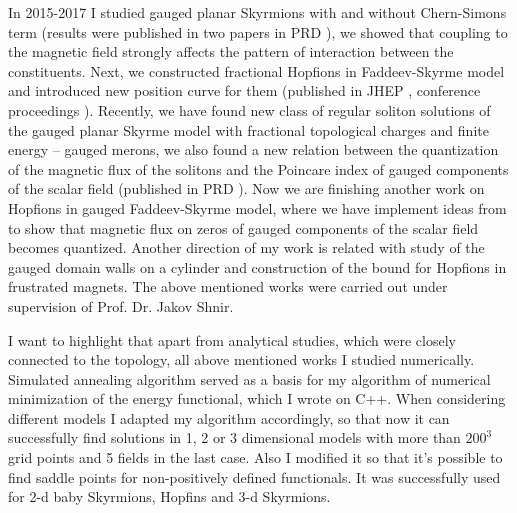 \documentclass[paper=a4,fontsize=11pt]{scrartcl} %
\begin{document}
In 2015-2017 I studied gauged planar Skyrmions with and without Chern-Simons term (results were published in two papers in PRD \cite{GaugedBaby,GaugedBabyCS}), we showed that coupling to the magnetic field strongly affects the pattern of interaction between the constituents. Next, we constructed fractional Hopfions in Faddeev-Skyrme model and introduced new position curve for them (published in JHEP \cite{FractionalHopf}, conference proceedings \cite{SkyrmeFamily}). Recently, we have found new class of regular soliton solutions of the gauged planar Skyrme model with fractional topological charges and finite energy -- gauged merons, we also found a new relation between the quantization of the magnetic flux of the solitons and the Poincare index of gauged components of the scalar field (published in PRD \cite{GaugedMerons}). Now we are finishing another work on Hopfions in gauged Faddeev-Skyrme model, where we have implement ideas from \cite{GaugedMerons} to show that magnetic flux on zeros of gauged components of the scalar field becomes quantized. Another direction of my work is related with study of the gauged domain walls on a cylinder and construction of the bound for Hopfions in frustrated magnets. The above mentioned works were carried out under supervision of Prof. Dr. Jakov Shnir.

I want to highlight that apart from analytical studies, which were closely connected to the topology, all above mentioned works I studied numerically. Simulated annealing algorithm served as a basis for my algorithm of numerical minimization of the energy functional, which I wrote on C++. When considering different models I adapted my algorithm accordingly, so that now it can successfully find solutions in 1, 2 or 3 dimensional models with more than $200^3$ grid points and 5 fields in the last case. Also I modified it so that it's possible to find saddle points for non-positively defined functionals. It was successfully used for 2-d baby Skyrmions, Hopfins and 3-d Skyrmions.
\end{document}
